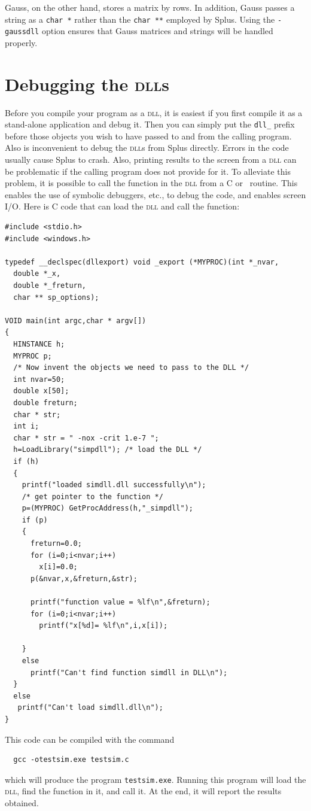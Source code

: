 Gauss, on the other hand, stores a matrix by rows. 
In addition, Gauss passes a string as a \texttt{char *} rather than the
\texttt{char **} employed by Splus.
Using the \texttt{-gaussdll}
option ensures that Gauss matrices and strings will be handled properly.


\section{Debugging the \textsc{dll}s}

Before you compile your program as a \textsc{dll}, it is easiest if you
first compile it as a stand-alone application and debug it.
Then you can simply put the \texttt{dll\_} prefix before
those objects you wish to have passed to and from
the calling program.
Also is inconvenient to debug the \textsc{dll}s from Splus directly.
Errors in the code usually cause Splus to crash. 
Also, printing results to the screen from a \textsc{dll} can
be problematic if the calling program does not
provide for it. To alleviate this
problem, it is possible to call the function in the \textsc{dll}
from a C or \cplus\ routine. This enables the use of symbolic debuggers, etc.,
to debug the code, and enables screen I/O. 
Here is C code that can load the \textsc{dll} and call the function:
\begin{lstlisting}
#include <stdio.h>
#include <windows.h>

typedef __declspec(dllexport) void _export (*MYPROC)(int *_nvar,
  double *_x, 
  double *_freturn,
  char ** sp_options);

VOID main(int argc,char * argv[])
{
  HINSTANCE h;
  MYPROC p;
  /* Now invent the objects we need to pass to the DLL */
  int nvar=50;
  double x[50];
  double freturn;
  char * str;
  int i;
  char * str = " -nox -crit 1.e-7 ";
  h=LoadLibrary("simpdll"); /* load the DLL */
  if (h)
  {
    printf("loaded simdll.dll successfully\n");
    /* get pointer to the function */  
    p=(MYPROC) GetProcAddress(h,"_simpdll");
    if (p)
    {
      freturn=0.0;
      for (i=0;i<nvar;i++)
        x[i]=0.0;
      p(&nvar,x,&freturn,&str);
      
      printf("function value = %lf\n",&freturn);
      for (i=0;i<nvar;i++)
        printf("x[%d]= %lf\n",i,x[i]);
      
    }
    else
      printf("Can't find function simdll in DLL\n");
  }
  else
   printf("Can't load simdll.dll\n");
}
\end{lstlisting}
This code can be compiled with the command
\begin{lstlisting}
  gcc -otestsim.exe testsim.c
\end{lstlisting}
which will produce the program
\texttt{testsim.exe}. Running this program will 
load the \textsc{dll}, find the function in it, and call it.
At the end, it will report the results obtained.


